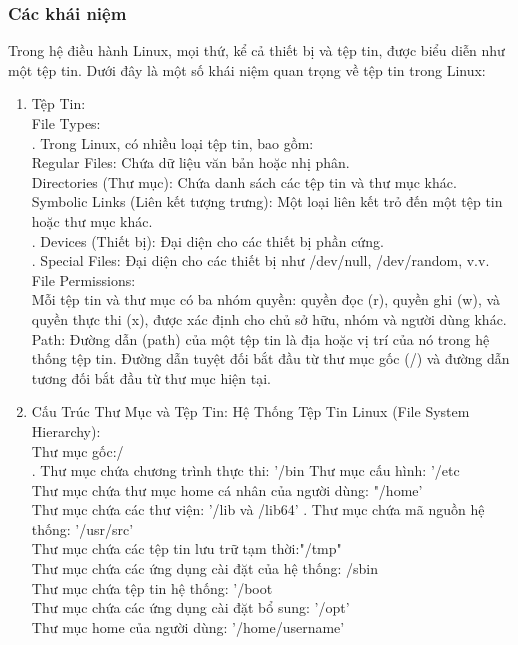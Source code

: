\documentclass[12pt,a4paper]{article}
\begin{document}
\subsubsection{Các khái niệm}
Trong hệ điều hành Linux, mọi thứ, kể cả thiết bị và tệp tin, được biểu diễn như một tệp tin. Dưới đây là một số khái niệm quan trọng về tệp tin trong Linux:
\begin{enumerate}
	\item Tệp Tin:\\
	File Types:\\
	.
	Trong Linux, có nhiều loại tệp tin, bao gồm:\\
	Regular Files: Chứa dữ liệu văn bản hoặc nhị phân.\\
	Directories (Thư mục): Chứa danh sách các tệp tin và thư mục khác.\\
	Symbolic Links (Liên kết tượng trưng): Một loại liên kết trỏ đến một tệp tin hoặc thư mục khác.\\
	. Devices (Thiết bị): Đại diện cho các thiết bị phần cứng.\\
	. Special Files: Đại diện cho các thiết bị như /dev/null, /dev/random, v.v.\\
	File Permissions:\\
	Mỗi tệp tin và thư mục có ba nhóm quyền: quyền đọc (r), quyền ghi (w), và quyền thực thi (x), được xác định cho chủ sở hữu, nhóm và người dùng khác.\\
	Path:
	Đường dẫn (path) của một tệp tin là địa hoặc vị trí của nó trong hệ thống tệp tin. Đường dẫn tuyệt đối bắt đầu từ thư mục gốc (/) và đường dẫn tương đối bắt đầu từ thư mục hiện tại.
	\item Cấu Trúc Thư Mục và Tệp Tin:
	Hệ Thống Tệp Tin Linux (File System Hierarchy): \\
	Thư mục gốc:/\\
	. Thư mục chứa chương trình thực thi: '/bin
	Thư mục cấu hình: '/etc\\
	Thư mục chứa thư mục home cá nhân của người dùng: "/home'\\
	Thư mục chứa các thư viện: '/lib và /lib64'
	. Thư mục chứa mã nguồn hệ thống: '/usr/src'\\
	Thư mục chứa các tệp tin lưu trữ tạm thời:"/tmp"\\
	Thư mục chứa các ứng dụng cài đặt của hệ thống: /sbin\\
	Thư mục chứa tệp tin hệ thống: '/boot\\
	Thư mục chứa các ứng dụng cài đặt bổ sung: '/opt'\\
	Thư mục home của người dùng: '/home/username'\\

\end{enumerate}
\end{document}
